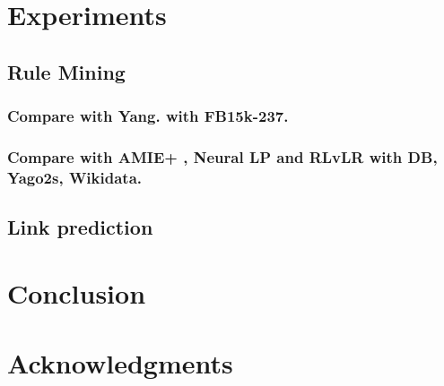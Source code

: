 \documentclass{article}
\begin{document}
%	
%	


	\section{Experiments}
	\subsection{Rule Mining}
	\subsubsection{Compare with Yang. with FB15k-237.}
	\subsubsection{Compare with AMIE+ , Neural LP and RLvLR with DB, Yago2s, Wikidata.}
	
	\subsection{Link prediction}
	


	\section{Conclusion}
	
	
	\section*{Acknowledgments}
	
	
	
	
	
\end{document}
